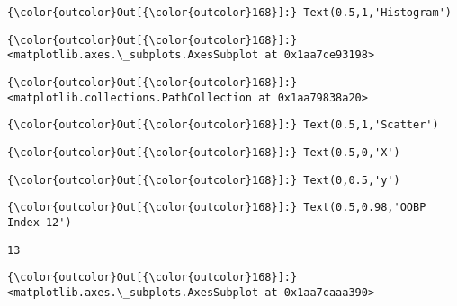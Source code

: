 \documentclass[11pt]{article}
\begin{document}
\begin{Verbatim}[commandchars=\\\{\}]
{\color{outcolor}Out[{\color{outcolor}168}]:} Text(0.5,1,'Histogram')
\end{Verbatim}
            
\begin{Verbatim}[commandchars=\\\{\}]
{\color{outcolor}Out[{\color{outcolor}168}]:} <matplotlib.axes.\_subplots.AxesSubplot at 0x1aa7ce93198>
\end{Verbatim}
            
\begin{Verbatim}[commandchars=\\\{\}]
{\color{outcolor}Out[{\color{outcolor}168}]:} <matplotlib.collections.PathCollection at 0x1aa79838a20>
\end{Verbatim}
            
\begin{Verbatim}[commandchars=\\\{\}]
{\color{outcolor}Out[{\color{outcolor}168}]:} Text(0.5,1,'Scatter')
\end{Verbatim}
            
\begin{Verbatim}[commandchars=\\\{\}]
{\color{outcolor}Out[{\color{outcolor}168}]:} Text(0.5,0,'X')
\end{Verbatim}
            
\begin{Verbatim}[commandchars=\\\{\}]
{\color{outcolor}Out[{\color{outcolor}168}]:} Text(0,0.5,'y')
\end{Verbatim}
            
\begin{Verbatim}[commandchars=\\\{\}]
{\color{outcolor}Out[{\color{outcolor}168}]:} Text(0.5,0.98,'OOBP Index 12')
\end{Verbatim}
            
    \begin{Verbatim}[commandchars=\\\{\}]
13

    \end{Verbatim}

\begin{Verbatim}[commandchars=\\\{\}]
{\color{outcolor}Out[{\color{outcolor}168}]:} <matplotlib.axes.\_subplots.AxesSubplot at 0x1aa7caaa390>
\end{Verbatim}
            
\end{document}
